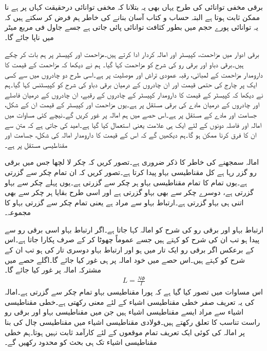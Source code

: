 برقی مخفی توانائی کی طرح یہاں بھی یہ بتلانا کہ مخفی توانائی درحقیقت کہاں پر ہے نا ممکن ثابت ہوتا ہے البتہ حساب و کتاب آسان بنانے کی خاطر ہم فرض کر سکتے ہیں کہ یہ توانائی پورے حجم میں بطور کثافت توانائی  پائی جاتی ہے جسے جاول فی مربع میٹر  میں ناپا جائے گا۔


برقی ادوار میں مزاحمت، کپیسٹر اور امالہ کردار ادا کرتے ہیں۔مزاحمت اور کپیسٹر پر ہم بات کر چکے ہیں۔برقی دباو اور برقی رو کی شرح کو مزاحمت کہا گیا۔ ہم نے دیکھا کہ مزاحمت کے قیمت کا دارومدار مزاحمت کے لمبائی، رقبہ عمودی تراش اور موصلیت پر ہے۔اسی طرح دو چادروں میں سے کسی ایک پر چارج کی حتمی قیمت اور ان چادروں  کے درمیان برقی دباو کی شرح کو کپیسٹنس کہا گیا۔ہم نے دیکھا کہ کپیسٹر کے قیمت کا دارومدار کپیسٹر کے چادروں کے رقبے، ان چادروں کے درمیان فاصلے اور چادروں کے درمیان مادے کی برقی مستقل پر ہے۔یوں مزاحمت اور کپیسٹر کے قیمت ان کے شکل، جسامت اور مادے کے مستقل پر ہے۔اس حصے میں ہم امالہ  پر غور کریں گے۔نیچے کئی مساوات میں امالہ اور فاصلہ دونوں کے لئے ایک ہی علامت یعنی  استعمال کیا گیا ہے۔امید کی جاتی ہے کہ متن سے ان کا فرق کرنا ممکن ہو گا۔ہم دیکھیں گے کہ اس کے قیمت کا دارومدار امالہ کی شکل، جسامت اور مقناطیسی مستقل پر ہے۔ 

امالہ سمجھنے کی خاطر  کا ذکر ضروری ہے۔تصور کریں کہ  چکر لا لچھا جس میں  برقی رو گزر رہا ہے کل  مقناطیسی بہاو پیدا کرتا ہے۔تصور کریں کہ  ان تمام  چکر سے گزرتی ہے۔یوں تمام کا تمام مقناطیسی بہاو ہر چکر سے گزرتی ہے۔یوں پہلے چکر سے  بہاو گزرتی ہے، دوسرے چکر سے بھی  بہاو گزرتی ہے اور اسی طرح بقایا ہر چکر سے بھی اتنی ہی بہاو گزرتی ہے۔ارتباط بہاو سے مراد  ہے یعنی تمام چکر سے گزرتی بہاو کا مجموعہ۔

ارتباط بہاو اور برقی رو کی شرح کو امالہ کہا جاتا ہے۔اگر ارتباط بہاو اسی برقی رو سے پیدا ہو تب ان کی شرح کو  کہتے ہیں جسے عموماً چھوٹا کر کے صرف  پکارا جاتا ہے۔اس کے برعکس اگر برقی رو ایک تار میں ہو اور ارتباط بہاو دوسری تار کی ہو تب ان کے شرح کو  کہتے ہیں۔اس حصے میں خود امالہ پر ہی غور کیا جائے گا۔اگلے حصے میں مشترکہ امالہ پر غور کیا جائے گا۔ 
\begin{align}
L=\frac{N \Phi}{I}
\end{align}
اس مساوات میں تصور کیا گیا ہے کہ پورا مقناطیسی بہاو تمام چکر سے گزرتی ہے۔امالہ کی یہ تعریف صفر خطی مقناطیسی اشیاء کے لئے معنی رکھتی ہے۔خطی مقناطیسی اشیاء سے مراد ایسے مقناطیسی اشیاء ہیں جن میں مقناطیسی بہاو اور برقی رو راست تناسب کا تعلق رکھتے ہیں۔فولادی مقناطیسی اشیاء میں مقناطیسی چال کی بنا پر امالہ کی کوئی ایک تعریف تمام موقعوں کے لئے کارآمد ثابت نہیں ہوتا۔ہم خطی مقناطیسی اشیاء تک ہی بحث کو محدود رکھیں گے۔

